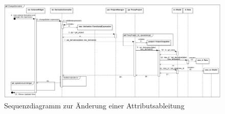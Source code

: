 \documentclass{article}
\begin{document}
\begin{figure}[H]%
    \centering
    \includegraphics[width=12cm]{docs/entwurf/Floriane/ChangeDerivative.png}
    \caption{Sequenzdiagramm zur Änderung einer Attributsableitung}
    \label{fig:sd:ChangeDerivativeSequenceDiagram}
\end{figure}
\end{document}
